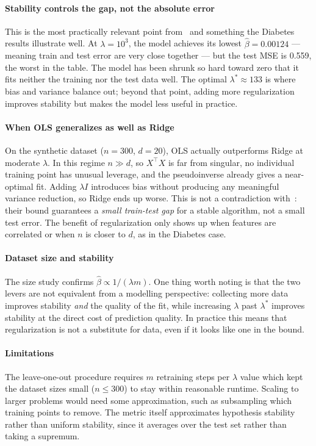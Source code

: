 \documentclass[11pt, a4paper, twoside]{article}
\newcommand{\betahat}{\hat{\beta}}
\begin{document}
\paragraph{Stability controls the gap, not the absolute error}
This is the most practically relevant point from~\cite{bousquet2002} and
something the Diabetes results illustrate well.
At $\lambda = 10^3$, the model achieves its lowest $\betahat = 0.00124$ --- meaning
train and test error are very close together --- but the test MSE is 0.559, the worst
in the table.
The model has been shrunk so hard toward zero that it fits neither the training nor
the test data well.
The optimal $\lambda^* \approx 133$ is where bias and variance balance out; beyond
that point, adding more regularization improves stability but makes the
model less useful in practice.

\paragraph{When OLS generalizes as well as Ridge}
On the synthetic dataset ($n=300$, $d=20$), OLS actually outperforms Ridge at moderate
$\lambda$.
In this regime $n \gg d$, so $X^\top X$ is far from singular, no individual training
point has unusual leverage, and the pseudoinverse already gives a near-optimal fit.
Adding $\lambda I$ introduces bias without producing any meaningful variance reduction,
so Ridge ends up worse.
This is not a contradiction with~\cite{bousquet2002}: their bound guarantees a
\emph{small train-test gap} for a stable algorithm, not a small test error.
The benefit of regularization only shows up when features are correlated or when $n$
is closer to $d$, as in the Diabetes case.

\paragraph{Dataset size and stability}
The size study confirms $\betahat \propto 1/(\lambda m)$.
One thing worth noting is that the two levers are not equivalent from a modelling
perspective: collecting more data improves stability \emph{and} the quality of the
fit, while increasing $\lambda$ past $\lambda^*$ improves stability at the direct
cost of prediction quality.
In practice this means that regularization is not a substitute for data, even if
it looks like one in the bound.

\paragraph{Limitations}
The leave-one-out procedure requires $m$ retraining steps per $\lambda$ value which kept the dataset sizes
small ($n \leq 300$) to stay within reasonable runtime.
Scaling to larger problems would need some approximation, such as subsampling which
training points to remove.
The metric itself approximates hypothesis stability rather than uniform stability,
since it averages over the test set rather than taking a supremum.
\end{document}
